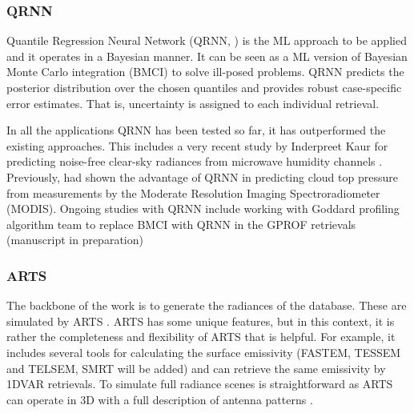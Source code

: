 \documentclass[12pt,oneside,a4paper]{article}
\begin{document}


 
\subsubsection{QRNN}
%
\label{sec:qrnn}

Quantile Regression Neural Network (QRNN, \citet{pfreundschuh:aneur:18}) is the
ML approach to be applied and it operates in a Bayesian manner. It can be seen
as a ML version of Bayesian Monte Carlo integration (BMCI) to solve ill-posed
problems. QRNN predicts the posterior distribution over the chosen quantiles
and provides robust case-specific error estimates. That is, uncertainty is
assigned to each individual retrieval.


In all the applications QRNN has been tested so far, it has outperformed the
existing approaches. This includes a very recent study by Inderpreet Kaur for
predicting noise-free clear-sky radiances from microwave humidity channels
\citep{kaur:2021:canma}. Previously, \citet{pfreundschuh:aneur:18} had shown
the advantage of QRNN in predicting cloud top pressure from measurements by the
Moderate Resolution Imaging Spectroradiometer (MODIS). Ongoing studies with
QRNN include working with Goddard profiling algorithm \citep[GPROF,][]
{kummerow:2015:thevo} team to replace BMCI with QRNN in the GPROF retrievals
(manuscript in preparation)


\subsubsection{ARTS}
\label{sec:arts}
% 
The backbone of the work is to generate the radiances of the database. These
are simulated by ARTS \citep[Atmospheric Radiative Transfer Simulator,][]
{eriksson:arts2:11}. ARTS has some unique features, but in this context,
it is rather the completeness and flexibility of ARTS that is helpful. For
example, it includes several tools for calculating the surface emissivity
(FASTEM, TESSEM and TELSEM, SMRT will be added) and can retrieve the same
emissivity by 1DVAR retrievals. To simulate full radiance scenes is
straightforward as ARTS can operate in 3D with a full description of antenna
patterns \citep{duncan:anexp:19}.
\end{document}
